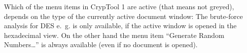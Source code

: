 Which of the menu items in CrypTool 1 are active (that means not greyed),
depends on the type of the currently active document window:
The brute-force analysis for DES e.~g. is only
available, if the active window is opened in the hexadecimal view. 
On the other hand the menu item ``Generate Random Numbers\dots''
is always available (even if no document is opened).



\clearpage
\begin{figure}[hb]
\begin{center}
\vspace{-30pt}
\end{center}
\end{figure}
\clearpage




